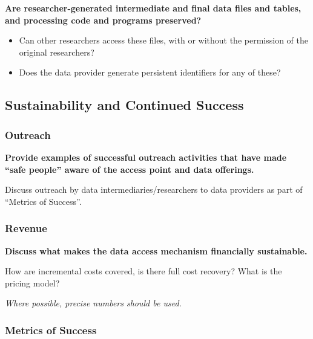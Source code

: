 \documentclass[
]{book}
\providecommand{\tightlist}{%
  \setlength{\itemsep}{0pt}\setlength{\parskip}{0pt}}
\begin{document}
\textbf{Are researcher-generated intermediate and final data files and tables, and processing code and programs preserved?}

\begin{itemize}
\tightlist
\item
  Can other researchers access these files, with or without the permission of the original researchers?
\item
  Does the data provider generate persistent identifiers for any of these?
\end{itemize}

\hypertarget{sustainability-and-continued-success-9}{%
\subsection*{Sustainability and Continued Success}\label{sustainability-and-continued-success-9}}

\hypertarget{outreach-7}{%
\subsubsection*{Outreach}\label{outreach-7}}

\textbf{Provide examples of successful outreach activities that have made ``safe people'' aware of the access point and data offerings.}

Discuss outreach by data intermediaries/researchers to data providers as part of ``Metrics of Success''.

\hypertarget{revenue-7}{%
\subsubsection*{Revenue}\label{revenue-7}}

\textbf{Discuss what makes the data access mechanism financially sustainable.}

How are incremental costs covered, is there full cost recovery? What is the pricing model?

\emph{Where possible, precise numbers should be used.}

\hypertarget{metrics-of-success-7}{%
\subsubsection*{Metrics of Success}\label{metrics-of-success-7}}
\end{document}
